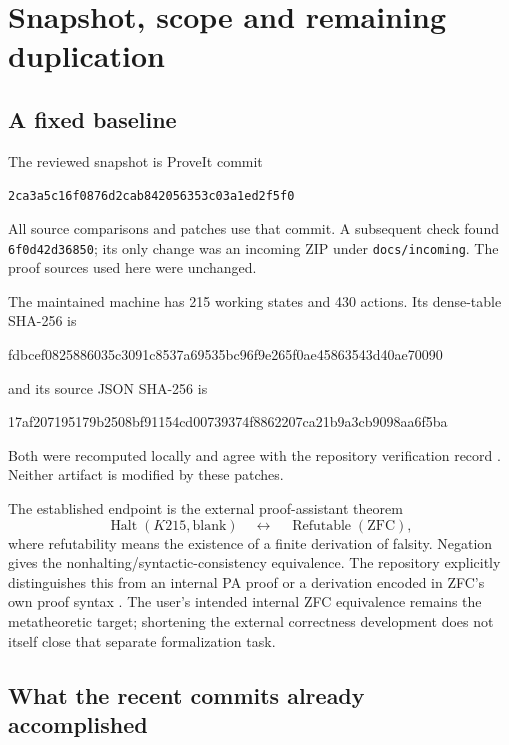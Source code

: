 \documentclass[11pt,letterpaper]{article}
\newcommand{\Halt}{\operatorname{Halt}}
\newcommand{\code}[1]{\texttt{#1}}
\newcommand{\pin}{\texttt{2ca3a5c16f0876d2cab842056353c03a1ed2f5f0}}
\begin{document}
\section{Snapshot, scope and remaining duplication}

\subsection{A fixed baseline}

The reviewed snapshot is ProveIt commit
\begin{center}\small\pin\end{center}
All source comparisons and patches use that commit. A subsequent check found
\code{6f0d42d36850}; its only change was an incoming
ZIP under \code{docs/incoming}. The proof sources used here were unchanged.

The maintained machine has 215 working states and 430 actions. Its dense-table
SHA-256 is
\begin{center}\small\ttfamily
fdbcef0825886035c3091c8537a69535bc96f9e265f0ae45863543d40ae70090
\end{center}
and its source JSON SHA-256 is
\begin{center}\small\ttfamily
17af207195179b2508bf91154cd00739374f8862207ca21b9a3cb9098aa6f5ba
\end{center}
Both were recomputed locally and agree with the repository verification record
\cite{verification}. Neither artifact is modified by these patches.

The established endpoint is the external proof-assistant theorem
\[
 \Halt(K215,\text{blank})\quad\longleftrightarrow\quad
 \operatorname{Refutable}(\mathrm{ZFC}),
\]
where refutability means the existence of a finite derivation of falsity.
Negation gives the nonhalting/syntactic-consistency equivalence. The repository
explicitly distinguishes this from an internal PA proof or a derivation encoded
in ZFC's own proof syntax \cite{verification}. The user's intended internal ZFC
equivalence remains the metatheoretic target; shortening the external correctness
development does not itself close that separate formalization task.

\subsection{What the recent commits already accomplished}
\end{document}
